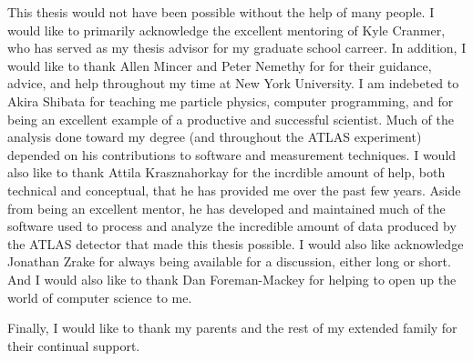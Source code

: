 %

This thesis would not have been possible without the help of many people.
I would like to primarily acknowledge the excellent mentoring of Kyle Cranmer, who has served as my thesis advisor for my graduate school carreer.
In addition, I would like to thank Allen Mincer and Peter Nemethy for for their guidance, advice, and help throughout my time at New York University.
I am indebeted to Akira Shibata for teaching me particle physics, computer programming, and for being an excellent example of a productive and successful scientist.
Much of the analysis done toward my degree (and throughout the ATLAS experiment) depended on his contributions to software and measurement techniques.
I would also like to thank Attila Krasznahorkay for the incrdible amount of help, both technical and conceptual, that he has provided me over the past few years.
Aside from being an excellent mentor, he has developed and maintained much of the software used to process and analyze the incredible amount of data
produced by the ATLAS detector that made this thesis possible.
I would also like acknowledge Jonathan Zrake for always being available for a discussion, either long or short.
And I would also like to thank Dan Foreman-Mackey for helping to open up the world of computer science to me.

Finally, I would like to thank my parents and the rest of my extended family for their continual support.
